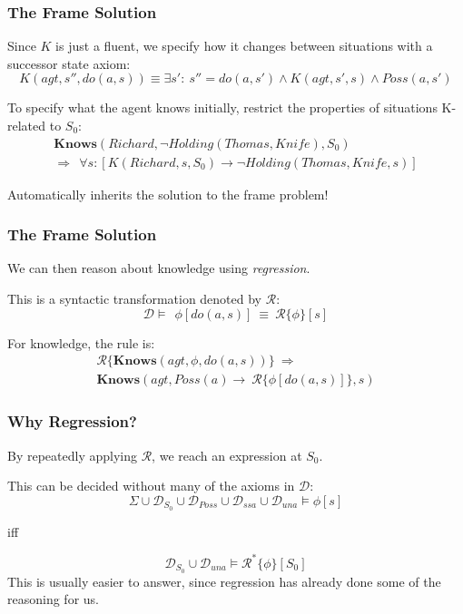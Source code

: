 \documentclass{beamer}
\begin{document}
\begin{frame}
\frametitle{The Frame Solution}
Since $K$ is just a fluent, we specify how it changes  between situations
with a successor state axiom:
\begin{equation*}
 K(agt,s'',do(a,s)) \equiv \exists s': \ s''=do(a,s')
 \wedge K(agt,s',s) \wedge Poss(a,s')
\end{equation*}

To specify what the agent knows initially, restrict the properties of situations
K-related to $S_0$:
\begin{gather*}
  \mathbf{Knows}(Richard,\neg Holding(Thomas,Knife),S_0) \\
  \Rightarrow \ \ \forall s: \left[K(Richard,s,S_0) \rightarrow \neg Holding(Thomas,Knife,s) \right]
\end{gather*}

Automatically inherits the solution to the frame problem!
\end{frame}

\begin{frame}
\frametitle{The Frame Solution}
We can then reason about knowledge using \emph{regression}.

This is a syntactic transformation denoted by $\mathcal{R}$:
\begin{equation*}
\mathcal{D} \models\ \ \phi[do(a,s)]\ \equiv\ \mathcal{R}\{\phi\}[s]
\end{equation*}

For knowledge, the rule is:
\begin{multline*}
  \mathcal{R}\{\mathbf{Knows}(agt,\phi,do(a,s))\}\ \Rightarrow\ \\
    \mathbf{Knows}(agt,Poss(a) \rightarrow\ \mathcal{R}\{\phi[do(a,s)]\},s)
\end{multline*}
\end{frame}

\begin{frame}
\frametitle{Why Regression?}
By repeatedly applying $\mathcal{R}$, we reach an expression at $S_0$.

This can be decided without many of the axioms in $\mathcal{D}$:
\begin{equation*}
  \Sigma \cup \mathcal{D}_{S_0} \cup \mathcal{D}_{Poss} \cup \mathcal{D}_{ssa} \cup \mathcal{D}_{una} \models \phi[s]
\end{equation*}
\begin{center}
iff
\end{center}
\begin{equation*}
  \mathcal{D}_{S_0} \cup \mathcal{D}_{una} \models \mathcal{R}^{*}\{\phi\}[S_0]
\end{equation*}
This is usually easier to answer, since regression has already done some
of the reasoning for us.
\end{frame}
\end{document}
